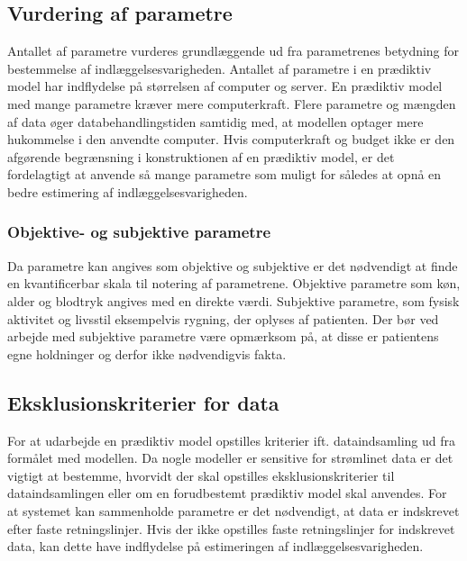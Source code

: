 \subsection{Vurdering af parametre}
Antallet af parametre vurderes grundlæggende ud fra parametrenes betydning for bestemmelse af indlæggelsesvarigheden. Antallet af parametre i en prædiktiv model har indflydelse på størrelsen af computer og server. En prædiktiv model med mange parametre kræver mere computerkraft. Flere parametre og mængden af data øger databehandlingstiden samtidig med, at modellen optager mere hukommelse i den anvendte computer.\cite{Kuhn2013}
Hvis computerkraft og budget ikke er den afgørende begrænsning i konstruktionen af en prædiktiv model, er det fordelagtigt at anvende så mange parametre som muligt for således at opnå en bedre estimering af indlæggelsesvarigheden.


\subsubsection{Objektive- og subjektive parametre}
Da parametre kan angives som objektive og subjektive er det nødvendigt at finde en kvantificerbar skala til notering af parametrene. Objektive parametre som køn, alder og blodtryk angives med en direkte værdi. Subjektive parametre, som fysisk aktivitet og livsstil eksempelvis rygning, der oplyses af patienten. Der bør ved arbejde med subjektive parametre være opmærksom på, at disse er patientens egne holdninger og derfor ikke nødvendigvis fakta. 


\subsection{Eksklusionskriterier for data} 
For at udarbejde en prædiktiv model opstilles kriterier ift. dataindsamling ud fra formålet med modellen. Da nogle modeller er sensitive for strømlinet data er det vigtigt at bestemme, hvorvidt der skal opstilles eksklusionskriterier til dataindsamlingen eller om en forudbestemt prædiktiv model skal anvendes.\cite{Kuhn2013}
For at systemet kan sammenholde parametre er det nødvendigt, at data er indskrevet efter faste retningslinjer. Hvis der ikke opstilles faste retningslinjer for indskrevet data, kan dette have indflydelse på estimeringen af indlæggelsesvarigheden.\cite{Kuhn2013} 

